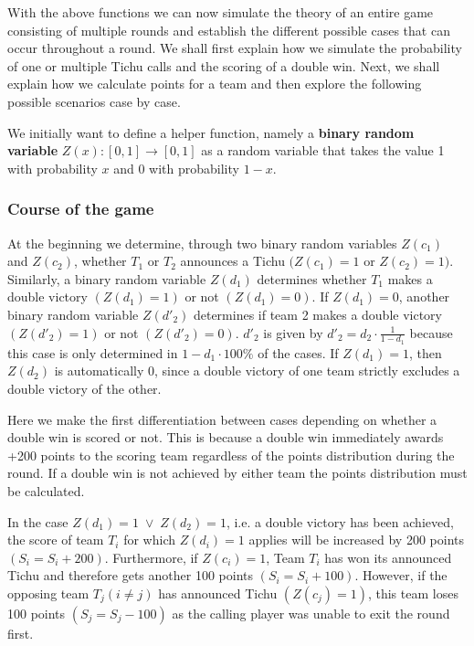 With the above functions we can now simulate the theory of an entire game consisting of multiple rounds and establish the different possible cases that can occur throughout a round. We shall first explain how we simulate the probability of one or multiple Tichu calls and the scoring of a double win. Next, we shall explain how we calculate points for a team and then explore the following possible scenarios case by case.

\begin{definition}

We initially want to define a helper function, namely a \textbf{binary random variable} $Z(x): [0,1] \to [0,1]$ as a random variable that takes the value 1 with probability $x$ and $0$ with probability $1-x$.

\end{definition}

\subsubsection{Course of the game}
At the beginning we determine, through two binary random variables $Z(c_1)$ and $Z(c_2)$, whether $T_1$ or $T_2$ announces a Tichu $(Z(c_1) = 1$ or $Z(c_2) = 1)$. Similarly, a binary random variable $Z(d_1)$ determines whether $T_1$ makes a double victory $(Z(d_1) = 1)$ or not $(Z(d_1) = 0)$. If $Z(d_1) = 0$, another binary random variable $Z(d'_2)$ determines if team 2 makes a double victory $(Z(d'_2) = 1)$ or not $(Z(d'_2) = 0)$. $d'_2$ is given by $d'_2 =d_2\cdot\frac{1}{1-d_1}$ because this case is only determined in $1-d_1\cdot 100\%$ of the cases. If $Z(d_1) = 1$, then $Z(d_2)$ is automatically 0, since a double victory of one team strictly excludes a double victory of the other.

Here we make the first differentiation between cases depending on whether a double win is scored or not. This is because a double win immediately awards +200 points to the scoring team regardless of the points distribution during the round. If a double win is not achieved by either team the points distribution must be calculated.

In the case $Z(d_1) = 1\; \lor\; Z(d_2) = 1$, i.e. a double victory has been achieved, the score of team $T_i$ for which $Z(d_i) = 1$ applies will be increased by 200 points $(S_i = S_i + 200)$. Furthermore, if $Z(c_i) = 1$, Team $T_i$ has won its announced Tichu and therefore gets another 100 points $(S_i = S_i + 100)$. However, if the opposing team $T_j (i \neq j)$ has announced Tichu $(Z(c_j) = 1)$, this team loses 100 points $(S_j = S_j - 100)$ as the calling player was unable to exit the round first.

